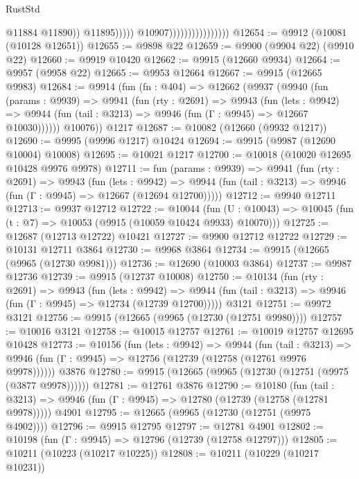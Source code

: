 \begin{lexlean}{RustStd}
\begin{coremodule}
{\begin{coremodule}
{{{{{{{{{{{{{{{{{{{{{{{{{                                                  @11884
                                                  @11890))
                                              @11895)))))
                                    @10907))))))))))))))))
@12654 := @9912 (@10081 (@10128 @12651))
@12655 := @9898 @22
@12659 := @9900 (@9904 @22) (@9910 @22)
@12660 := @9919 @10420
@12662 := @9915 (@12660 @9934)
@12664 := @9957 (@9958 @22)
@12665 := @9953 @12664
@12667 := @9915 (@12665 @9983)
@12684 := @9914
    (fun (fn : @404) =>
    @12662
      (@9937
        (@9940
          (fun (params : @9939) =>
          @9941
            (fun (rty : @2691) =>
            @9943
              (fun (lets : @9942) =>
              @9944 (fun (tail : @3213) => @9946 (fun (Γ : @9945) => @12667 @10030))))))
        @10076))
    @1217
@12687 := @10082 (@12660 (@9932 @1217))
@12690 := @9995 (@9996 @1217) @10424
@12694 := @9915 (@9987 (@12690 @10004) @10008)
@12695 := @10021 @1217
@12700 := @10018 (@10020 @12695 @10428 @9976 @9978)
@12711 := fun (params : @9939) =>
  @9941
    (fun (rty : @2691) =>
    @9943
      (fun (lets : @9942) =>
      @9944 (fun (tail : @3213) => @9946 (fun (Γ : @9945) => @12667 (@12694 @12700)))))
@12712 := @9940 @12711
@12713 := @9937 @12712
@12722 := @10044
    (fun (U : @10043) => @10045 (fun (t : @7) => @10053 (@9915 (@10059 @10424 @9933) @10070)))
@12725 := @12687 (@12713 @12722) @10421
@12727 := @9900 @12712 @12722
@12729 := @10131 @12711 @3864
@12730 := @9968 @3864
@12734 := @9915 (@12665 (@9965 (@12730 @9981)))
@12736 := @12690 (@10003 @3864)
@12737 := @9987 @12736
@12739 := @9915 (@12737 @10008)
@12750 := @10134
    (fun (rty : @2691) =>
    @9943
      (fun (lets : @9942) =>
      @9944 (fun (tail : @3213) => @9946 (fun (Γ : @9945) => @12734 (@12739 @12700)))))
    @3121
@12751 := @9972 @3121
@12756 := @9915 (@12665 (@9965 (@12730 (@12751 @9980))))
@12757 := @10016 @3121
@12758 := @10015 @12757
@12761 := @10019 @12757 @12695 @10428
@12773 := @10156
    (fun (lets : @9942) =>
    @9944
      (fun (tail : @3213) =>
      @9946 (fun (Γ : @9945) => @12756 (@12739 (@12758 (@12761 @9976 @9978))))))
    @3876
@12780 := @9915 (@12665 (@9965 (@12730 (@12751 (@9975 (@3877 @9978))))))
@12781 := @12761 @3876
@12790 := @10180
    (fun (tail : @3213) => @9946 (fun (Γ : @9945) => @12780 (@12739 (@12758 (@12781 @9978)))))
    @4901
@12795 := @12665 (@9965 (@12730 (@12751 (@9975 @4902))))
@12796 := @9915 @12795
@12797 := @12781 @4901
@12802 := @10198 (fun (Γ : @9945) => @12796 (@12739 (@12758 @12797)))
@12805 := @10211 (@10223 (@10217 @10225))
@12808 := @10211 (@10229 (@10217 @10231))
}}}}}}}}}}}}}}}}}}}}}}}}}
\end{coremodule}}
\end{coremodule}
\end{lexlean}
